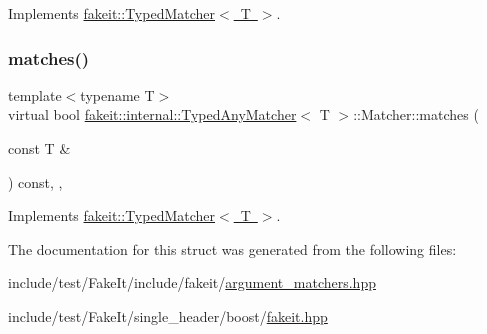 Implements \mbox{\hyperlink{structfakeit_1_1TypedMatcher_ac553bb6ac7c98a489c92fa6ace0f2e2b}{fakeit\+::\+Typed\+Matcher$<$ T $>$}}.

\mbox{\label{structfakeit_1_1internal_1_1TypedAnyMatcher_1_1Matcher_a7a4fb0a098671bd53dd9403169734649}} 
\subsubsection{\texorpdfstring{matches()}{matches()}\hspace{0.1cm}{\footnotesize\ttfamily [9/9]}}
{\footnotesize\ttfamily template$<$typename T$>$ \\
virtual bool \mbox{\hyperlink{structfakeit_1_1internal_1_1TypedAnyMatcher}{fakeit\+::internal\+::\+Typed\+Any\+Matcher}}$<$ T $>$\+::Matcher\+::matches (\begin{DoxyParamCaption}\item[{const T \&}]{ }\end{DoxyParamCaption}) const\hspace{0.3cm}{\ttfamily [inline]}, {\ttfamily [override]}, {\ttfamily [virtual]}}



Implements \mbox{\hyperlink{structfakeit_1_1TypedMatcher_ac553bb6ac7c98a489c92fa6ace0f2e2b}{fakeit\+::\+Typed\+Matcher$<$ T $>$}}.



The documentation for this struct was generated from the following files\+:\begin{DoxyCompactItemize}
\item 
include/test/\+Fake\+It/include/fakeit/\mbox{\hyperlink{argument__matchers_8hpp}{argument\+\_\+matchers.\+hpp}}\item 
include/test/\+Fake\+It/single\+\_\+header/boost/\mbox{\hyperlink{single__header_2boost_2fakeit_8hpp}{fakeit.\+hpp}}\end{DoxyCompactItemize}
